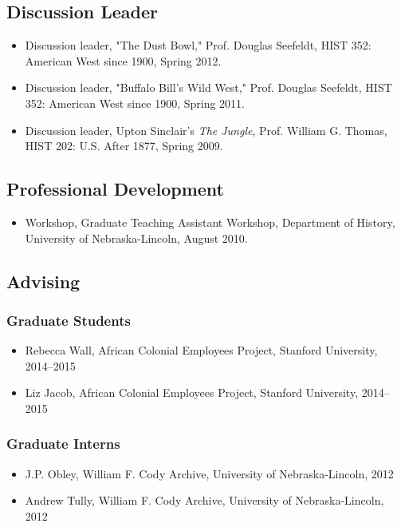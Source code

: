 \documentclass[10pt]{article}
\begin{document}
\subsection*{Discussion Leader}

\begin{itemize}
  \item Discussion leader, "The Dust Bowl," Prof. Douglas Seefeldt, HIST 352: American West since 1900, Spring 2012.
  \item Discussion leader, "Buffalo Bill's Wild West," Prof. Douglas Seefeldt, HIST 352: American West since 1900, Spring 2011.
  \item Discussion leader, Upton Sinclair's \textit{The Jungle}, Prof. William G. Thomas, HIST 202: U.S. After 1877, Spring 2009.
\end{itemize}

\subsection*{Professional Development}

\begin{itemize}
  \item Workshop, Graduate Teaching Assistant Workshop, Department of History, University of Nebraska-Lincoln, August 2010.
\end{itemize}

\subsection*{Advising}

\subsubsection*{Graduate Students}

\begin{itemize}
  \item Rebecca Wall, African Colonial Employees Project, Stanford University, 2014--2015
  \item Liz Jacob, African Colonial Employees Project, Stanford University, 2014--2015
\end{itemize}

\subsubsection*{Graduate Interns}

\begin{itemize}
  \item J.P. Obley, William F. Cody Archive, University of Nebraska-Lincoln, 2012
  \item Andrew Tully, William F. Cody Archive, University of Nebraska-Lincoln, 2012
\end{itemize}
\end{document}
